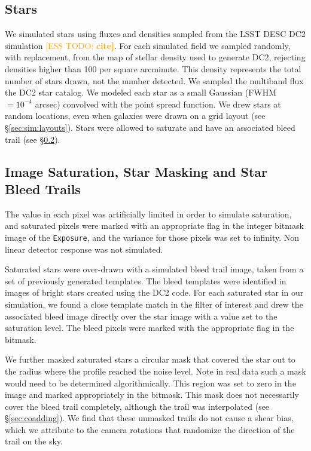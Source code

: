 \documentclass[twocolumn,twocolappendix,astrosym]{openjournal}
\newcommand{\esstodo}[1]{\textcolor{orange}{[ESS TODO: \bf #1]}}
\newcommand{\calexp}{\texttt{Exposure}}
\begin{document}
\subsection{Stars} \label{sec:sim:stars}

We simulated stars using fluxes and densities sampled from the LSST DESC DC2
simulation \esstodo{cite}.  For each simulated field we sampled randomly, with
replacement, from the map of stellar density used to generate DC2, rejecting
densities higher than 100 per square arcminute.  This density represents
the total number of stars drawn, not the number detected.  We
sampled the multiband flux the DC2 star catalog.  We modeled
each star as a small Gaussian (FWHM $= 10^{-4}$ arcsec) convolved with the
point spread function.  We drew stars at random locations, even when galaxies
were drawn on a grid layout (see \S \ref{sec:sim:layouts}).  Stars were allowed
to saturate and have an associated bleed trail (see
\S \ref{sec:sim:satbleeds}).

\subsection{Image Saturation, Star Masking and Star Bleed Trails} \label{sec:sim:satbleeds}

The value in each pixel was artificially limited in order to simulate
saturation, and saturated pixels were marked with an appropriate flag in the
integer bitmask image of the \calexp, and the variance for those
pixels was set to infinity.  Non linear detector response was not simulated.

Saturated stars were over-drawn with a simulated bleed trail image, taken from
a set of previously generated templates.  The bleed templates were identified
in images of bright stars created using the DC2 code.  For each saturated star
in our simulation, we found a close template match in the filter of interest
and drew the associated bleed image directly over the star image with a value
set to the saturation level. The bleed pixels were marked with the appropriate
flag in the bitmask.

We further masked saturated stars a circular mask that covered the star out to
the radius where the profile reached the noise level.  Note in real data such a
mask would need to be determined algorithmically.   This region was set to zero
in the image and marked appropriately in the bitmask.   This mask does not
necessarily cover the bleed trail completely, although the trail was
interpolated (see \S \ref{sec:coadding}).  We find that these unmasked trails
do not cause a shear bias, which we attribute to the camera rotations that
randomize the direction of the trail on the sky.
\end{document}

